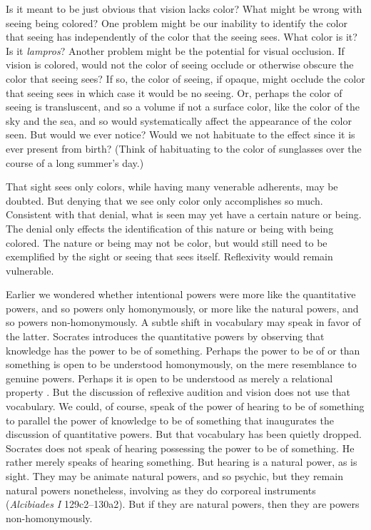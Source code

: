 Is it meant to be just obvious that vision lacks color? What might be wrong with seeing being colored? One problem might be our inability to identify the color that seeing has independently of the color that the seeing sees. What color is it? Is it \emph{lampros}? Another problem might be the potential for visual occlusion. If vision is colored, would not the color of seeing occlude or otherwise obscure the color that seeing sees? If so, the color of seeing, if opaque, might occlude the color that seeing sees in which case it would be no seeing. Or, perhaps the color of seeing is transluscent, and so a volume if not a surface color, like the color of the sky and the sea, and so would systematically affect the appearance of the color seen. But would we ever notice? Would we not habituate to the effect since it is ever present from birth? (Think of habituating to the color of sunglasses over the course of a long summer's day.)

That sight sees only colors, while having many venerable adherents, may be doubted. But denying that we see only color only accomplishes so much. Consistent with that denial, what is seen may yet have a certain nature or being. The denial only effects the identification of this nature or being with being colored. The nature or being may not be color, but would still need to be exemplified by the sight or seeing that sees itself. Reflexivity would remain vulnerable.

Earlier we wondered whether intentional powers were more like the quantitative powers, and so powers only homonymously, or more like the natural powers, and so powers non-homonymously. A subtle shift in vocabulary may speak in favor of the latter. Socrates introduces the quantitative powers by observing that knowledge has the power to be of something. Perhaps the power to be of or than something is open to be understood homonymously, on the mere resemblance to genuine powers. Perhaps it is open to be understood as merely a relational property \citep[24 n74]{Moore:2019aa}. But the discussion of reflexive audition and vision does not use that vocabulary. We could, of course, speak of the power of hearing to be of something to parallel the power of knowledge to be of something that inaugurates the discussion of quantitative powers. But that vocabulary has been quietly dropped. Socrates does not speak of hearing possessing the power to be of something. He rather merely speaks of hearing something. But hearing is a natural power, as is sight. They may be animate natural powers, and so psychic, but they remain natural powers nonetheless, involving as they do corporeal instruments (\emph{Alcibiades I} 129c2–130a2). But if they are natural powers, then they are powers non-homonymously.

